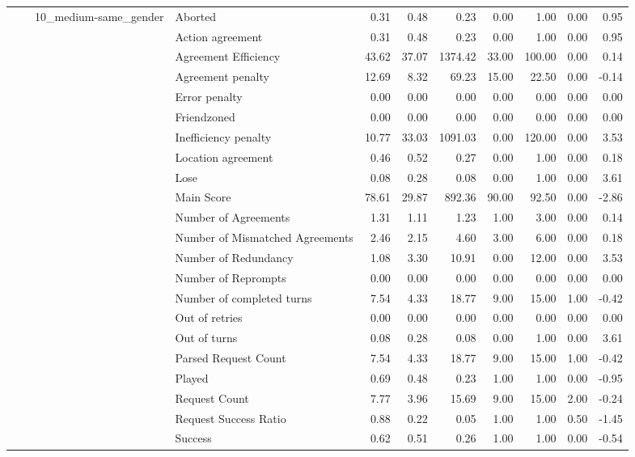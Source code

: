 \begin{tabular}{llllrrrrrrr}
\cline{3-11}
 &  & \multirow[t]{27}{*}{10_medium-same_gender} & Aborted & 0.31 & 0.48 & 0.23 & 0.00 & 1.00 & 0.00 & 0.95 \\
 &  &  & Action agreement & 0.31 & 0.48 & 0.23 & 0.00 & 1.00 & 0.00 & 0.95 \\
 &  &  & Agreement Efficiency & 43.62 & 37.07 & 1374.42 & 33.00 & 100.00 & 0.00 & 0.14 \\
 &  &  & Agreement penalty & 12.69 & 8.32 & 69.23 & 15.00 & 22.50 & 0.00 & -0.14 \\
 &  &  & Error penalty & 0.00 & 0.00 & 0.00 & 0.00 & 0.00 & 0.00 & 0.00 \\
 &  &  & Friendzoned & 0.00 & 0.00 & 0.00 & 0.00 & 0.00 & 0.00 & 0.00 \\
 &  &  & Inefficiency penalty & 10.77 & 33.03 & 1091.03 & 0.00 & 120.00 & 0.00 & 3.53 \\
 &  &  & Location agreement & 0.46 & 0.52 & 0.27 & 0.00 & 1.00 & 0.00 & 0.18 \\
 &  &  & Lose & 0.08 & 0.28 & 0.08 & 0.00 & 1.00 & 0.00 & 3.61 \\
 &  &  & Main Score & 78.61 & 29.87 & 892.36 & 90.00 & 92.50 & 0.00 & -2.86 \\
 &  &  & Number of Agreements & 1.31 & 1.11 & 1.23 & 1.00 & 3.00 & 0.00 & 0.14 \\
 &  &  & Number of Mismatched Agreements & 2.46 & 2.15 & 4.60 & 3.00 & 6.00 & 0.00 & 0.18 \\
 &  &  & Number of Redundancy & 1.08 & 3.30 & 10.91 & 0.00 & 12.00 & 0.00 & 3.53 \\
 &  &  & Number of Reprompts & 0.00 & 0.00 & 0.00 & 0.00 & 0.00 & 0.00 & 0.00 \\
 &  &  & Number of completed turns & 7.54 & 4.33 & 18.77 & 9.00 & 15.00 & 1.00 & -0.42 \\
 &  &  & Out of retries & 0.00 & 0.00 & 0.00 & 0.00 & 0.00 & 0.00 & 0.00 \\
 &  &  & Out of turns & 0.08 & 0.28 & 0.08 & 0.00 & 1.00 & 0.00 & 3.61 \\
 &  &  & Parsed Request Count & 7.54 & 4.33 & 18.77 & 9.00 & 15.00 & 1.00 & -0.42 \\
 &  &  & Played & 0.69 & 0.48 & 0.23 & 1.00 & 1.00 & 0.00 & -0.95 \\
 &  &  & Request Count & 7.77 & 3.96 & 15.69 & 9.00 & 15.00 & 2.00 & -0.24 \\
 &  &  & Request Success Ratio & 0.88 & 0.22 & 0.05 & 1.00 & 1.00 & 0.50 & -1.45 \\
 &  &  & Success & 0.62 & 0.51 & 0.26 & 1.00 & 1.00 & 0.00 & -0.54 \\

\end{tabular}
